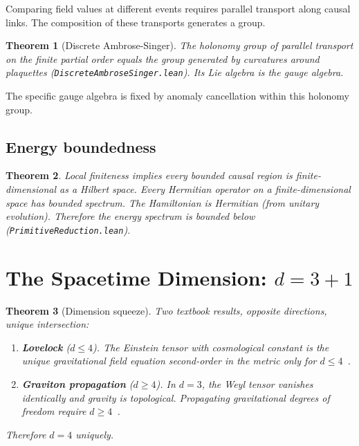 \documentclass[11pt,letterpaper]{article}
\newtheorem{theorem}{Theorem}
\theoremstyle{remark}
\newcommand{\lean}[1]{\texttt{\small #1}}
\begin{document}
Comparing field values at different events requires parallel
transport along causal links. The composition of these transports
generates a group.

\begin{theorem}[Discrete Ambrose-Singer]
\label{thm:ambrose_singer}
The holonomy group of parallel transport on the finite partial order
equals the group generated by curvatures around plaquettes
(\lean{DiscreteAmbroseSinger.lean}). Its Lie algebra is the gauge
algebra.
\end{theorem}

The specific gauge algebra is fixed by anomaly cancellation within
this holonomy group.

\subsection{Energy boundedness}

\begin{theorem}
Local finiteness implies every bounded causal region is
finite-dimensional as a Hilbert space. Every Hermitian operator on a
finite-dimensional space has bounded spectrum. The Hamiltonian is
Hermitian (from unitary evolution). Therefore the energy spectrum is
bounded below (\lean{PrimitiveReduction.lean}).
\end{theorem}

\section{The Spacetime Dimension: $d = 3{+}1$}
\label{sec:dimension}

\begin{theorem}[Dimension squeeze]
\label{thm:dimension}
Two textbook results, opposite directions, unique intersection:
\begin{enumerate}[nosep]
  \item \textbf{Lovelock} ($d \leq 4$). The Einstein tensor with
    cosmological constant is the unique gravitational field equation
    second-order in the metric only for $d \leq 4$~\cite{Lovelock1971}.
  \item \textbf{Graviton propagation} ($d \geq 4$). In $d = 3$, the
    Weyl tensor vanishes identically and gravity is topological.
    Propagating gravitational degrees of freedom require
    $d \geq 4$~\cite{Witten1988}.
\end{enumerate}
Therefore $d = 4$ uniquely.
\end{theorem}
\end{document}
